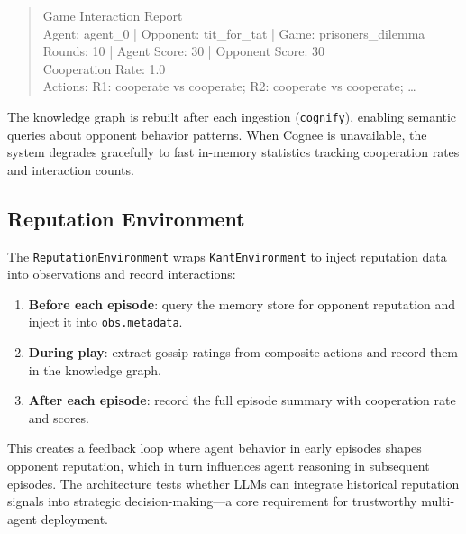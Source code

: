 \begin{quote}\small\ttfamily
Game Interaction Report\\
Agent: agent\_0 | Opponent: tit\_for\_tat | Game: prisoners\_dilemma\\
Rounds: 10 | Agent Score: 30 | Opponent Score: 30\\
Cooperation Rate: 1.0\\
Actions: R1: cooperate vs cooperate; R2: cooperate vs cooperate; \ldots
\end{quote}

\noindent The knowledge graph is rebuilt after each ingestion
(\texttt{cognify}), enabling semantic queries about opponent behavior patterns.
When Cognee is unavailable, the system degrades gracefully to fast in-memory
statistics tracking cooperation rates and interaction counts.

\subsection{Reputation Environment}
\label{sec:rep-env}

The \texttt{ReputationEnvironment} wraps \texttt{KantEnvironment} to
inject reputation data into observations and record interactions:

\begin{enumerate}[nosep]
    \item \textbf{Before each episode}: query the memory store for opponent
          reputation and inject it into \texttt{obs.metadata}.
    \item \textbf{During play}: extract gossip ratings from composite actions
          and record them in the knowledge graph.
    \item \textbf{After each episode}: record the full episode summary with
          cooperation rate and scores.
\end{enumerate}

\noindent This creates a feedback loop where agent behavior in early episodes
shapes opponent reputation, which in turn influences agent reasoning in
subsequent episodes. The architecture tests whether LLMs can integrate
historical reputation signals into strategic decision-making---a core
requirement for trustworthy multi-agent deployment.
